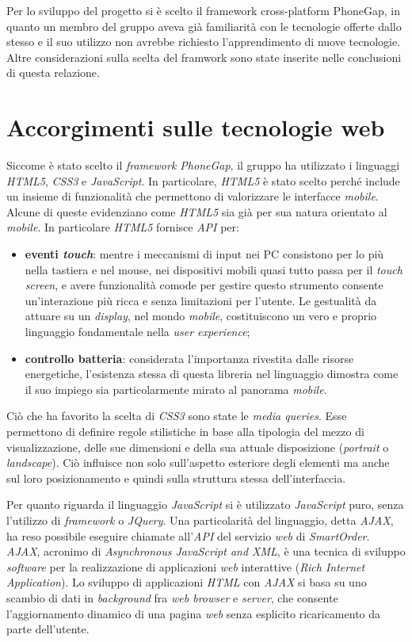 \documentclass[12pt, a4paper, titlepage]{report}
\begin{document}
	Per lo sviluppo del progetto si è scelto il framework cross-platform PhoneGap, in quanto un membro del gruppo aveva già familiarità con le tecnologie offerte dallo stesso e il suo utilizzo non avrebbe richiesto l'apprendimento di nuove tecnologie. Altre considerazioni sulla scelta del framwork sono state inserite nelle conclusioni di questa relazione.
	
	\section{Accorgimenti sulle tecnologie web}
	
	Siccome è stato scelto il \textit{framework PhoneGap}, il gruppo ha utilizzato i linguaggi \textit{HTML5}, \textit{CSS3} e \textit{JavaScript}. In particolare, \textit{HTML5} è stato scelto perché include un insieme di funzionalità che permettono di valorizzare le interfacce \textit{mobile}. Alcune di queste evidenziano come \textit{HTML5} sia già per sua natura orientato al \textit{mobile}. In particolare \textit{HTML5} fornisce \textit{API} per:
	\begin{itemize}
		\item \textbf{eventi \textit{touch}}: mentre i meccanismi di input nei PC consistono per lo più nella tastiera e nel mouse, nei dispositivi mobili quasi tutto passa per il \textit{touch screen}, e avere funzionalità comode per gestire questo strumento consente un'interazione più ricca e senza limitazioni per l'utente. Le gestualità da attuare su un \textit{display}, nel mondo \textit{mobile}, costituiscono un vero e proprio linguaggio fondamentale nella \textit{user experience};
		\item \textbf{controllo batteria}: considerata l'importanza rivestita dalle risorse energetiche, l'esistenza stessa di questa libreria nel linguaggio dimostra come il suo impiego sia particolarmente mirato al panorama \textit{mobile}.
	\end{itemize}
	Ciò che ha favorito la scelta di \textit{CSS3} sono state le \textit{media queries}. Esse permettono di definire regole stilistiche in base alla tipologia del mezzo di visualizzazione, delle sue dimensioni e della sua attuale disposizione (\textit{portrait} o \textit{landscape}). Ciò influisce non solo sull'aspetto esteriore degli elementi ma anche sul loro posizionamento e quindi sulla struttura stessa dell'interfaccia.
	\medskip
	
	
	\noindent Per quanto riguarda il linguaggio \textit{JavaScript} si è utilizzato \textit{JavaScript} puro, senza l'utilizzo di \textit{framework} o \textit{JQuery}. Una particolarità del linguaggio, detta \textit{AJAX}, ha reso possibile eseguire chiamate all'\textit{API} del servizio \textit{web} di \textit{SmartOrder}. \textit{AJAX}, acronimo di \textit{\textit{Asynchronous JavaScript and XML}}, è una tecnica di sviluppo \textit{software} per la realizzazione di applicazioni \textit{web} interattive (\textit{Rich Internet Application}). Lo sviluppo di applicazioni \textit{HTML} con \textit{AJAX} si basa su uno scambio di dati in \textit{background} fra \textit{web browser} e \textit{server}, che consente l'aggiornamento dinamico di una pagina \textit{web} senza esplicito ricaricamento da parte dell'utente.
	
\end{document}
